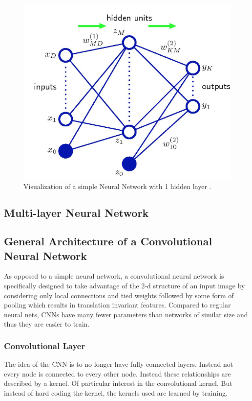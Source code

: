 \documentclass[12pt, twocolumn]{article}
\begin{document}
\begin{figure}
\includegraphics[scale=.7]{simpleNN.png}

\caption{Visualization of a simple Neural Network with 1 hidden layer \cite{Bishop} . }
\label{fig:basicNN}
\end{figure}





\subsection{Multi-layer Neural Network}

\subsection{General Architecture of a Convolutional Neural Network}
As opposed to a simple neural network, a convolutional neural network is specifically designed to take advantage of the 2-d structure of an input image by considering only local connections and tied weights followed by some form of pooling which results in translation invariant features. Compared to regular neural nets,  CNNs  have many fewer parameters than networks of similar size and thus they are easier to train.



\subsubsection{Convolutional Layer}
The idea of the CNN is to no longer have fully connected layers. Instead not every node is connected to every other node. Instead these relationships are described by a kernel. Of particular interest in the convolutional kernel. But instead of hard coding the kernel, the kernels used are learned by training. 
\end{document}
